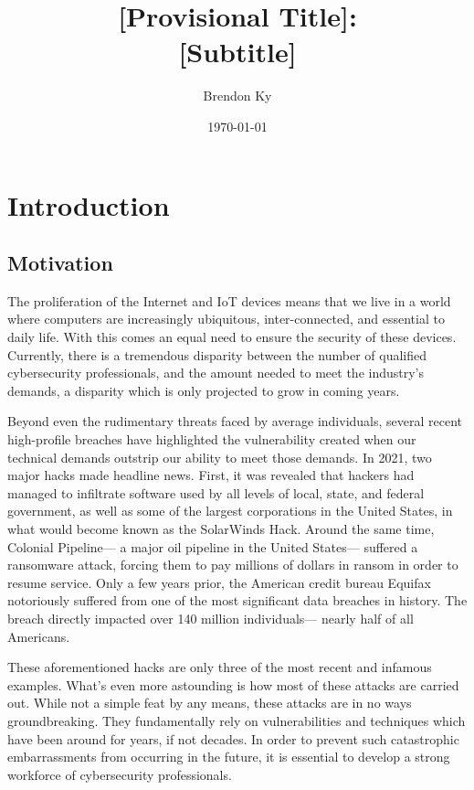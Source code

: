 \documentclass{article}
\title{
    [Provisional Title]: \\
    \large [Subtitle]
}
\author{Brendon Ky}
\date{\today}
\begin{document}
\maketitle

\section{Introduction}

    \subsection{Motivation} 
    The proliferation of the Internet and IoT devices means that we live in a world where computers are increasingly ubiquitous, inter-connected, and essential to daily life. 
    With this comes an equal need to ensure the security of these devices. 
    Currently, there is a tremendous disparity between the number of qualified cybersecurity professionals, and the amount needed to meet the industry's demands, a disparity which is only projected to grow in coming years.
    
    Beyond even the rudimentary threats faced by average individuals, several recent high-profile breaches have highlighted the vulnerability created when our technical demands outstrip our ability to meet those demands. 
    In 2021, two major hacks made headline news. 
    First, it was revealed that hackers had managed to infiltrate software used by all levels of local, state, and federal government, as well as some of the largest corporations in the United States, in what would become known as the SolarWinds Hack.
    Around the same time, Colonial Pipeline---
    a major oil pipeline in the United States---
    suffered a ransomware attack, forcing them to pay millions of dollars in ransom in order to resume service. 
    Only a few years prior, the American credit bureau Equifax notoriously suffered from one of the most significant data breaches in history. 
    The breach directly impacted over 140 million individuals---
    nearly half of all Americans. 
    
    These aforementioned hacks are only three of the most recent and infamous examples. 
    What's even more astounding is how most of these attacks are carried out. 
    While not a simple feat by any means, these attacks are in no ways groundbreaking.
    They fundamentally rely on vulnerabilities and techniques which have been around for years, if not decades. 
    In order to prevent such catastrophic embarrassments from occurring in the future, it is essential to develop a strong workforce of cybersecurity professionals. 
\end{document}

